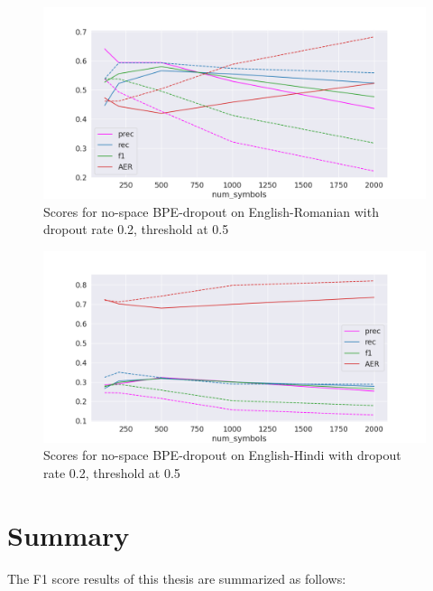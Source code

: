 \begin{figure}[!ht]
    \centering
    \includegraphics[width=13cm]{../reports/scores_dropout_bpe/no space/0.2/eng_ron_ns_0.5_thres_fastalign.png}
    \caption{Scores for no-space BPE-dropout on English-Romanian with dropout rate 0.2, threshold at 0.5}
\end{figure}

\clearpage
\begin{figure}[!ht]
    \centering
    \includegraphics[width=13cm]{../reports/scores_dropout_bpe/no space/0.2/eng_hin_ns_0.5_thres_fastalign.png}
    \caption{Scores for no-space BPE-dropout on English-Hindi with dropout rate 0.2, threshold at 0.5}
\end{figure}

\section{Summary}

The F1 score results of this thesis are summarized as follows:

